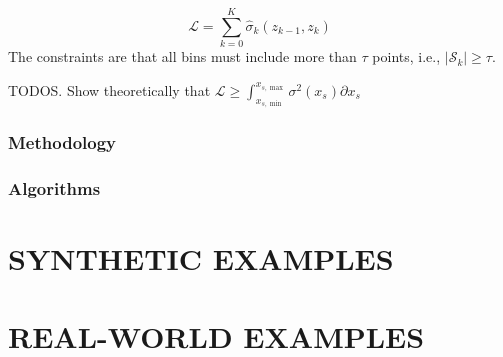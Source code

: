 \documentclass[twoside]{article}
\begin{document}
\begin{equation}
  \label{eq:1}
  \mathcal{L} = \sum_{k=0}^K \hat{\sigma}_k(z_{k-1}, z_k)
\end{equation}
%
The constraints are that all bins must include more than \(\tau\)
points, i.e., \(|\mathcal{S}_k| \geq \tau\).

\noindent
TODOS. Show theoretically that \(\mathcal{L} \geq \int_{x_{s, \min}}^{x_{s, \max}}\sigma^2(x_s) \partial x_s\)


\subsubsection{Methodology}



\subsubsection{Algorithms}

\section{SYNTHETIC EXAMPLES}

\section{REAL-WORLD EXAMPLES}
\end{document}
